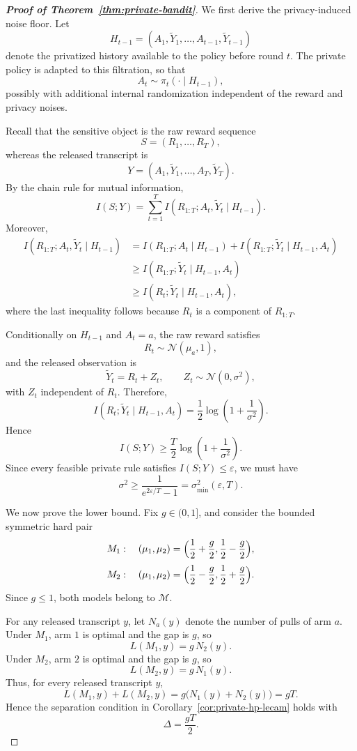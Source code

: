 \documentclass[journal]{IEEEtran}
\begin{document}
\begin{proof}[\textbf{Proof of Theorem~\ref{thm:private-bandit}}]
We first derive the privacy-induced noise floor. Let
\[
H_{t-1}=(A_1,\widetilde Y_1,\dots,A_{t-1},\widetilde Y_{t-1})
\]
denote the privatized history available to the policy before round \(t\). The
private policy is adapted to this filtration, so that
\[
A_t\sim \pi_t(\cdot\mid H_{t-1}),
\]
possibly with additional internal randomization independent of the reward and
privacy noises.

Recall that the sensitive object is the raw reward sequence
\[
S=(R_1,\dots,R_T),
\]
whereas the released transcript is
\[
Y=(A_1,\widetilde Y_1,\dots,A_T,\widetilde Y_T).
\]
By the chain rule for mutual information,
\[
I(S;Y)
=
\sum_{t=1}^T
I(R_{1:T};A_t,\widetilde Y_t\mid H_{t-1}).
\]
Moreover,
\begin{align*}
I(R_{1:T};A_t,\widetilde Y_t\mid H_{t-1})
&=
I(R_{1:T};A_t\mid H_{t-1})
+
I(R_{1:T};\widetilde Y_t\mid H_{t-1},A_t)  \\
&\ge
I(R_{1:T};\widetilde Y_t\mid H_{t-1},A_t)  \\
&\ge
I(R_t;\widetilde Y_t\mid H_{t-1},A_t),
\end{align*}
where the last inequality follows because \(R_t\) is a component of
\(R_{1:T}\).

Conditionally on \(H_{t-1}\) and \(A_t=a\), the raw reward satisfies
\[
R_t\sim \mathcal N(\mu_a,1),
\]
and the released observation is
\[
\widetilde Y_t=R_t+Z_t,
\qquad
Z_t\sim\mathcal N(0,\sigma^2),
\]
with \(Z_t\) independent of \(R_t\). Therefore,
\[
I(R_t;\widetilde Y_t\mid H_{t-1},A_t)
=
\frac12\log\left(1+\frac1{\sigma^2}\right).
\]
Hence
\[
I(S;Y)
\ge
\frac T2\log\left(1+\frac1{\sigma^2}\right).
\]
Since every feasible private rule satisfies \(I(S;Y)\le \varepsilon\), we must
have
\[
\sigma^2
\ge
\frac{1}{e^{2\varepsilon/T}-1}
=
\sigma_{\min}^2(\varepsilon,T).
\]


We now prove the lower bound. Fix \(g\in(0,1]\), and consider the bounded
symmetric hard pair
\[
M_1:\quad
(\mu_1,\mu_2)
=
\Bigl(\frac12+\frac g2,\frac12-\frac g2\Bigr),
\]
\[
M_2:\quad
(\mu_1,\mu_2)
=
\Bigl(\frac12-\frac g2,\frac12+\frac g2\Bigr).
\]
Since \(g\le 1\), both models belong to \(\mathcal M\).

For any released transcript \(y\), let \(N_a(y)\) denote the number of pulls of
arm \(a\). Under \(M_1\), arm \(1\) is optimal and the gap is \(g\), so
\[
L(M_1,y)=g\,N_2(y).
\]
Under \(M_2\), arm \(2\) is optimal and the gap is \(g\), so
\[
L(M_2,y)=g\,N_1(y).
\]
Thus, for every released transcript \(y\),
\[
L(M_1,y)+L(M_2,y)
=
g\bigl(N_1(y)+N_2(y)\bigr)
=
gT.
\]
Hence the separation condition in Corollary~\ref{cor:private-hp-lecam} holds with
\[
\Delta=\frac{gT}{2}.
\]


\end{proof}
\end{document}
